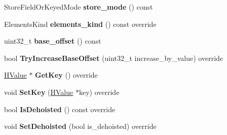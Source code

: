 \begin{DoxyCompactItemize}
\item 
Store\+Field\+Or\+Keyed\+Mode {\bfseries store\+\_\+mode} () const \hypertarget{classv8_1_1internal_1_1_h_store_keyed_a7a9ccf49301182b3dd4adcf9c1cc9105}{}\label{classv8_1_1internal_1_1_h_store_keyed_a7a9ccf49301182b3dd4adcf9c1cc9105}

\item 
Elements\+Kind {\bfseries elements\+\_\+kind} () const  override\hypertarget{classv8_1_1internal_1_1_h_store_keyed_a807a89d5cb0192129d2bf5260decbf3a}{}\label{classv8_1_1internal_1_1_h_store_keyed_a807a89d5cb0192129d2bf5260decbf3a}

\item 
uint32\+\_\+t {\bfseries base\+\_\+offset} () const \hypertarget{classv8_1_1internal_1_1_h_store_keyed_aa187375bad6709f0a1002aaab1a90282}{}\label{classv8_1_1internal_1_1_h_store_keyed_aa187375bad6709f0a1002aaab1a90282}

\item 
bool {\bfseries Try\+Increase\+Base\+Offset} (uint32\+\_\+t increase\+\_\+by\+\_\+value) override\hypertarget{classv8_1_1internal_1_1_h_store_keyed_a24f8a5ee12e1c0cf75fd6cc2ea7fdaab}{}\label{classv8_1_1internal_1_1_h_store_keyed_a24f8a5ee12e1c0cf75fd6cc2ea7fdaab}

\item 
\hyperlink{classv8_1_1internal_1_1_h_value}{H\+Value} $\ast$ {\bfseries Get\+Key} () override\hypertarget{classv8_1_1internal_1_1_h_store_keyed_a0aed0cb7b50b5d2854b843392b42a1da}{}\label{classv8_1_1internal_1_1_h_store_keyed_a0aed0cb7b50b5d2854b843392b42a1da}

\item 
void {\bfseries Set\+Key} (\hyperlink{classv8_1_1internal_1_1_h_value}{H\+Value} $\ast$key) override\hypertarget{classv8_1_1internal_1_1_h_store_keyed_a42139f716367c85b1588ba18224c5507}{}\label{classv8_1_1internal_1_1_h_store_keyed_a42139f716367c85b1588ba18224c5507}

\item 
bool {\bfseries Is\+Dehoisted} () const  override\hypertarget{classv8_1_1internal_1_1_h_store_keyed_a584964a3d157999782ee9bd4d09aeb2d}{}\label{classv8_1_1internal_1_1_h_store_keyed_a584964a3d157999782ee9bd4d09aeb2d}

\item 
void {\bfseries Set\+Dehoisted} (bool is\+\_\+dehoisted) override\hypertarget{classv8_1_1internal_1_1_h_store_keyed_af50df4844e3ebd7219f2d18fdea6f5bb}{}\label{classv8_1_1internal_1_1_h_store_keyed_af50df4844e3ebd7219f2d18fdea6f5bb}


\end{DoxyCompactItemize}
